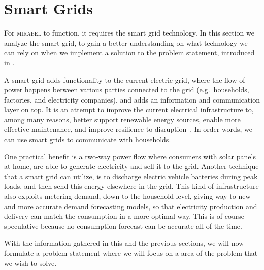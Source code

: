 \section{Smart Grids}\label{sec:smartgrids}
For \textsc{mirabel} to function, it requires the smart grid technology. In this section we analyze the smart grid, to gain a better understanding on what technology we can rely on when we implement a solution to the problem statement, introduced in .

A smart grid adds functionality to the current electric grid, where the flow of power happens between various parties connected to the grid (e.g.\ households, factories, and electricity companies), and adds an information and communication layer on top. It is an attempt to improve the current electrical infrastructure to, among many reasons, better support renewable energy sources, enable more effective maintenance, and improve resilience to disruption~\cite{jrcSmartGrid}. In order words, we can use smart grids to communicate with households. 

One practical benefit is a two-way power flow where consumers with solar panels at home, are able to generate electricity and sell it to the grid. Another technique that a smart grid can utilize, is to discharge electric vehicle batteries during peak loads, and then send this energy elsewhere in the grid. This kind of infrastructure also exploits metering demand, down to the household level, giving way to new and more accurate demand forecasting models, so that electricity production and delivery can match the consumption in a more optimal way. This is of course speculative because no consumption forecast can be  accurate all of the time. 

With the information gathered in this and the previous sections, we will now formulate a problem statement where we will focus on a area of the problem that we wish to solve. 